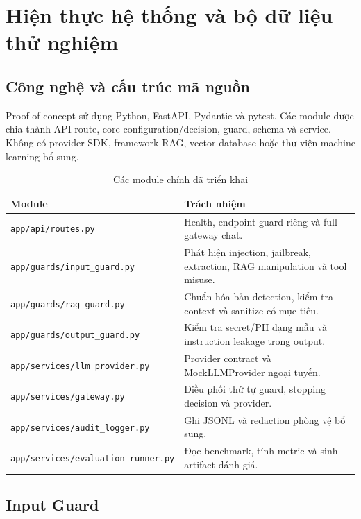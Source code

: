 \chapter{Hiện thực hệ thống và bộ dữ liệu thử nghiệm}
\label{chap:implementation}

\section{Công nghệ và cấu trúc mã nguồn}

Proof-of-concept sử dụng Python, FastAPI, Pydantic và pytest. Các module được
chia thành API route, core configuration/decision, guard, schema và service.
Không có provider SDK, framework RAG, vector database hoặc thư viện machine
learning bổ sung.

\begin{table}[H]
\centering
\caption{Các module chính đã triển khai}
\label{tab:implemented-modules}
\begin{tabularx}{\textwidth}{p{4.2cm}X}
\toprule
Module & Trách nhiệm \\
\midrule
\texttt{app/api/routes.py} & Health, endpoint guard riêng và full gateway chat. \\
\texttt{app/guards/input\_guard.py} & Phát hiện injection, jailbreak, extraction, RAG manipulation và tool misuse. \\
\texttt{app/guards/rag\_guard.py} & Chuẩn hóa bản detection, kiểm tra context và sanitize có mục tiêu. \\
\texttt{app/guards/output\_guard.py} & Kiểm tra secret/PII dạng mẫu và instruction leakage trong output. \\
\texttt{app/services/llm\_provider.py} & Provider contract và MockLLMProvider ngoại tuyến. \\
\texttt{app/services/gateway.py} & Điều phối thứ tự guard, stopping decision và provider. \\
\texttt{app/services/audit\_logger.py} & Ghi JSONL và redaction phòng vệ bổ sung. \\
\texttt{app/services/evaluation\_runner.py} & Đọc benchmark, tính metric và sinh artifact đánh giá. \\
\bottomrule
\end{tabularx}
\end{table}

\section{Input Guard}

